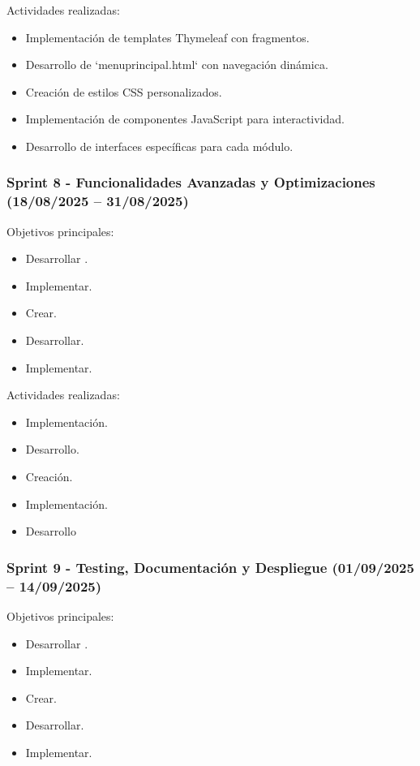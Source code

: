 Actividades realizadas:
\begin{itemize}
\tightlist
\item
Implementación de templates Thymeleaf con fragmentos.
\item
Desarrollo de `menuprincipal.html` con navegación dinámica.
\item
Creación de estilos CSS personalizados.
\item
Implementación de componentes JavaScript para interactividad.
\item
Desarrollo de interfaces específicas para cada módulo.
\end{itemize}

\subsubsection{Sprint 8 - Funcionalidades Avanzadas y Optimizaciones (18/08/2025 – 31/08/2025)} 

Objetivos principales:
\begin{itemize}
\tightlist
\item
Desarrollar .
\item
Implementar.
\item
Crear.
\item
Desarrollar.
\item
Implementar.
\end{itemize}

Actividades realizadas:
\begin{itemize}
\tightlist
\item
Implementación.
\item
Desarrollo.
\item
Creación.
\item
Implementación.
\item
Desarrollo
\end{itemize}

\subsubsection{Sprint 9 - Testing, Documentación y Despliegue (01/09/2025 – 14/09/2025)} 

Objetivos principales:
\begin{itemize}
\tightlist
\item
Desarrollar .
\item
Implementar.
\item
Crear.
\item
Desarrollar.
\item
Implementar.
\end{itemize}

